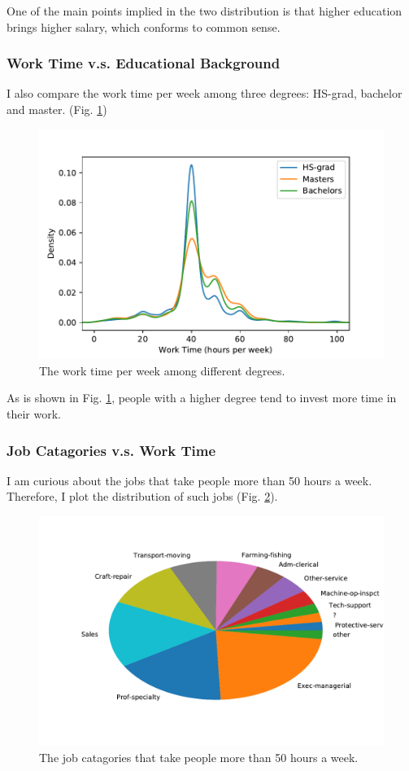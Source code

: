 \documentclass[12pt,a4paper]{article}
\theoremstyle{definition}
\begin{document}
One of the main points implied in the two distribution is that higher education brings higher salary, which conforms to common sense.

\subsubsection{Work Time v.s. Educational Background}

I also compare the work time per week among three degrees: HS-grad, bachelor and master. (Fig. \ref{fig::worktime_vs})

\begin{figure}[H]
	\centering
	\includegraphics[width=0.75\linewidth]{img/work_time_com1.pdf}
	\caption{The work time per week among different degrees.}
	\label{fig::worktime_vs}
\end{figure}

As is shown in Fig. \ref{fig::worktime_vs}, people with a higher degree tend to invest more time in their work.

\subsubsection{Job Catagories v.s. Work Time}

I am curious about the jobs that take people more than 50 hours a week. Therefore, I plot the distribution of such jobs (Fig. \ref{fig::job}).

\begin{figure}[H]
	\centering
	\includegraphics[width=0.75\linewidth]{img/job_dis.pdf}
	\caption{The job catagories that take people more than 50 hours a week.}
	\label{fig::job}
\end{figure}
\end{document}
